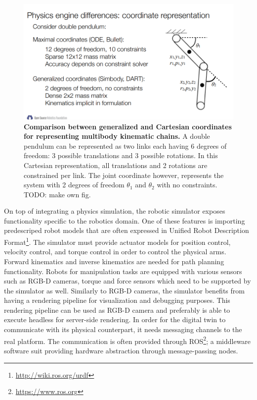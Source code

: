 \documentclass[\home/main.tex]{subfiles}
\begin{document}
\begin{figure}
    \centering
    \includegraphics[]{figures/gen_vs_max_coordinates.png}
    \caption[Comparison between generalized and Cartesian coordinates for representing multibody kinematic chains.]{\textbf{Comparison between generalized and Cartesian coordinates for representing multibody kinematic chains.} A double pendulum can be represented as two links each having 6 degrees of freedom: 3 possible translations and 3 possible rotations. In this Cartesian representation, all translations and 2 rotations are constrained per link. The joint coordinate however, represents the system with 2 degrees of freedom $\theta_1$ and $\theta_2$ with no constraints. TODO: make own fig. }
    \label{fig:generalized_vs_cartesian_coordinates}
\end{figure}

On top of integrating a physics simulation, the robotic simulator exposes functionality specific to the robotics domain.
One of these features is importing predescriped robot models that are often expressed in Unified Robot Description Format\footnote{\url{http://wiki.ros.org/urdf}}. 
The simulator must provide actuator models for position control, velocity control, and torque control in order to control the physical arms. 
Forward kinematics and inverse kinematics are needed for path planning functionality. 
Robots for manipulation tasks are equipped with various sensors such as RGB-D cameras, torque and force sensors which need to be supported by the simulator as well. 
Similarly to RGB-D cameras, the simulator benefits from having a rendering pipeline for visualization and debugging purposes. This rendering pipeline can be used as RGB-D camera and preferably is able to execute headless for server-side rendering.  
In order for the digital twin to communicate with its physical counterpart, it needs messaging channels to the real platform. The communication is often provided through ROS\footnote{\url{https://www.ros.org}}; a middleware software suit providing hardware abstraction through message-passing nodes. 
\end{document}
